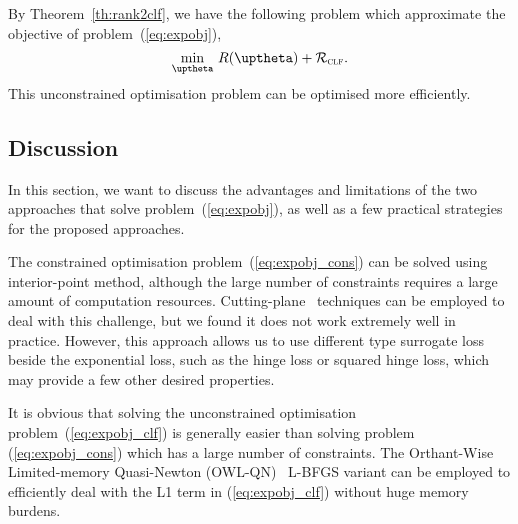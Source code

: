 By Theorem~\ref{th:rank2clf}, we have the following problem
which approximate the objective of problem~(\ref{eq:expobj}),
\begin{equation}
\label{eq:expobj_clf}
\min_{\uptheta} \, R(\uptheta) + \RCal_\textsc{clf}.
\end{equation}
This unconstrained optimisation problem can be optimised more efficiently.



\subsection{Discussion}

In this section, we want to discuss the advantages and limitations of the 
two approaches that solve problem~(\ref{eq:expobj}), 
as well as a few practical strategies for the proposed approaches.

The constrained optimisation problem~(\ref{eq:expobj_cons}) can be solved using interior-point method,
although the large number of constraints requires a large amount of computation resources.
Cutting-plane~\cite{avriel2003nonlinear} techniques can be employed to deal with this challenge, 
but we found it does not work extremely well in practice.
However, this approach allows us to use different type surrogate loss beside the exponential loss,
such as the hinge loss or squared hinge loss, which may provide a few other desired properties. %

It is obvious that solving the unconstrained optimisation problem~(\ref{eq:expobj_clf})
is generally easier than solving problem (\ref{eq:expobj_cons}) which has a large number of constraints.
The Orthant-Wise Limited-memory Quasi-Newton (OWL-QN)~\cite{andrew2007scalable} L-BFGS variant can be employed to
efficiently deal with the L1 term in (\ref{eq:expobj_clf}) without huge memory burdens.

